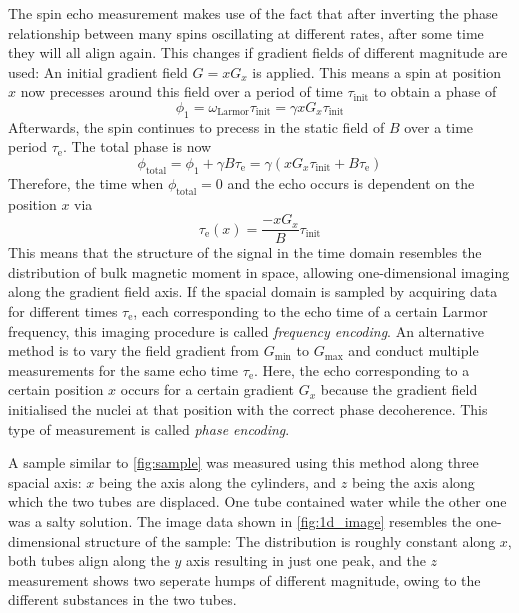 \documentclass[
    parskip=half, 
    twoside=false,
    twocolumn=true,
    fontsize=11pt,
]{scrarticle}
\begin{document}
The spin echo measurement makes use of the fact that after inverting the phase relationship between many spins oscillating at different rates, after some time they will all align again. This changes if gradient fields of different magnitude are used: An initial gradient field $G = x G_x$ is applied. This means a spin at position $x$ now precesses around this field over a period of time $\tau_\text{init}$ to obtain a phase of
\begin{equation*}
 \phi_1 = \omega_\text{Larmor} \tau_\text{init} = \gamma x G_x \tau_\text{init}
\end{equation*}
Afterwards, the spin continues to precess in the static field of $B$ over a time period $\tau_\text{e}$. The total phase is now
\begin{equation*}
 \phi_\text{total} = \phi_1 + \gamma B \tau_\text{e} = \gamma (x G_x \tau_\text{init} + B \tau_\text{e})
\end{equation*}
Therefore, the time when $\phi_\text{total} = 0$ and the echo occurs is dependent on the position $x$ via
\begin{equation}
 \tau_\text{e}(x) = \frac{-x G_x}{B} \tau_\text{init}
\end{equation}
This means that the structure of the signal in the time domain resembles the distribution of bulk magnetic moment in space, allowing one-dimensional imaging along the gradient field axis. If the spacial domain is sampled by acquiring data for different times $\tau_\text{e}$, each corresponding to the echo time of a certain Larmor frequency, this imaging procedure is called \textit{frequency encoding}. An alternative method is to vary the field gradient from $G_\text{min}$ to $G_\text{max}$ and conduct multiple measurements for the same echo time $\tau_\text{e}$. Here, the echo corresponding to a certain position $x$ occurs for a certain gradient $G_x$ because the gradient field initialised the nuclei at that position with the correct phase decoherence. This type of measurement is called \textit{phase encoding}.

A sample similar to \autoref{fig:sample} was measured using this method along three spacial axis: $x$ being the axis along the cylinders, and $z$ being the axis along which the two tubes are displaced. One tube contained water while the other one was a salty solution. The image data shown in \autoref{fig:1d_image} resembles the one-dimensional structure of the sample: The distribution is roughly constant along $x$, both tubes align along the $y$ axis resulting in just one peak, and the $z$ measurement shows two seperate humps of different magnitude, owing to the different substances in the two tubes.
\end{document}

